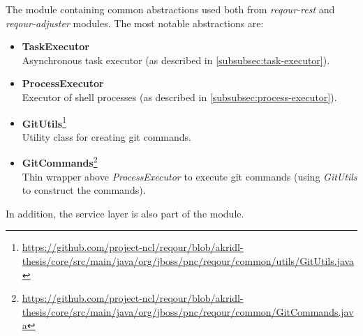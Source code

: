 \documentclass[../main.tex]{subfiles}
\begin{document}
The module containing common abstractions used both from \textit{reqour-rest} and \textit{reqour-adjuster} modules. The most notable abstractions are:
\begin{itemize}
    \item \textbf{TaskExecutor}\\
    Asynchronous task executor (as described in \ref{subsubsec:task-executor}).

    \item \textbf{ProcessExecutor}\\
    Executor of shell processes (as described in \ref{subsubsec:process-executor}).

    \item \textbf{GitUtils}\footnote{\url{https://github.com/project-ncl/reqour/blob/akridl-thesis/core/src/main/java/org/jboss/pnc/reqour/common/utils/GitUtils.java}}\\
    Utility class for creating git commands.

    \item \textbf{GitCommands}\footnote{\url{https://github.com/project-ncl/reqour/blob/akridl-thesis/core/src/main/java/org/jboss/pnc/reqour/common/GitCommands.java}}\\
    Thin wrapper above \textit{ProcessExecutor} to execute git commands (using \textit{GitUtils} to construct the commands).
\end{itemize}

In addition, the service layer is also part of the module.
\end{document}
